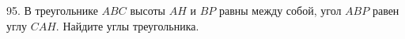 95. В треугольнике $ABC$ высоты $AH$ и $BP$ равны между собой, угол $ABP$ равен углу $CAH.$ Найдите углы треугольника.\\
